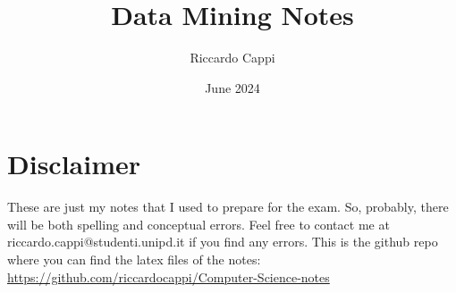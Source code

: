 \documentclass{book}
\title{Data Mining Notes}
\author{Riccardo Cappi}
\date{June 2024}
\begin{document}
\maketitle

\section{Disclaimer}
These are just my notes that I used to prepare for the exam. So, probably, there will be both spelling and conceptual errors. Feel free to contact me at riccardo.cappi@studenti.unipd.it if you find any errors. This is the github repo where you can find the latex files of the notes: \url{https://github.com/riccardocappi/Computer-Science-notes}

\tableofcontents












\end{document}
